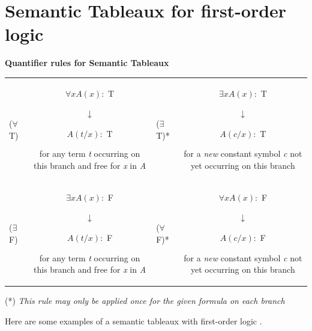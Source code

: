 \section{Semantic Tableaux for first-order logic}

\begin{center}
\textbf{Quantifier rules for Semantic Tableaux}
\end{center}
\begin{tabular}{l c l c}
($ \forall $ T) &  \parbox{5cm}{\centering$ \forall x A(x) : $ T
\newline
$ \downarrow $
\newline
$ A(t/x) : $ T
\newline
for any term \textit{t} occurring on this branch and free for \textit{x} in \textit{A}} & ($ \exists $ T)* & \parbox{5cm}{\centering$ \exists x A(x) : $ T
\newline
$ \downarrow $
\newline
$ A(c/x) : $ T
\newline
for a \textit{new} constant symbol \textit{c} not yet occurring on this branch}  \\[1.5cm]

($ \exists $ F) & \parbox{5cm}{\centering$ \exists x A(x) : $ F
\newline
$ \downarrow $
\newline
$ A(t/x) : $ F
\newline
for any term \textit{t} occurring on this branch and free for \textit{x} in \textit{A}} & ($ \forall $ F)*  & \parbox{5cm}{\centering$ \forall x A(x) : $ F
\newline
$ \downarrow $
\newline
$ A(c/x) : $ F
\newline
for a \textit{new} constant symbol \textit{c} not yet occurring on this branch}  \\
\end{tabular}

(*) \textit{This rule may only be applied once for the given formula on each branch}

Here are some examples of a semantic tableaux with first-order logic \cite[p. 46]{LecPartII}.


